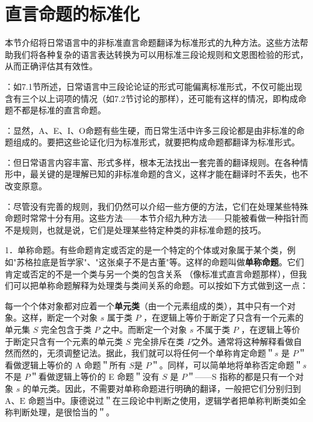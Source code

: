 \section{直言命题的标准化}

\begin{logicbox}[title=引言]
本节介绍将日常语言中的非标准直言命题翻译为标准形式的九种方法。这些方法帮助我们将各种复杂的语言表达转换为可以用标准三段论规则和文恩图检验的形式，从而正确评估其有效性。
\end{logicbox}

\begin{theorembox}[title=标准化的基本原则]
：如7.1节所述，日常语言中三段论论证的形式可能偏离标准形式，不仅可能出现含有三个以上词项的情况（如7.2节讨论的那样），还可能有这样的情况，即构成命题不都是标准的直言命题。

：显然，A、E、I、O命题有些生硬，而日常生活中许多三段论都是由非标准的命题组成的。要把这些论证化归为标准形式，就要把构成命题都翻译为标准形式。

：但日常语言内容丰富、形式多样，根本无法找出一套完善的翻译规则。在各种情形中，最关键的是理解已知的非标准命题的含义，这样才能在翻译时不丢失，也不改变原意。

：尽管没有完善的规则，我们仍然可以介绍一些方便的方法，它们在处理某些特殊命题时常常十分有用。这些方法——本节介绍九种方法——只能被看做一种指针而不是规则，也就是说，它们是处理某些特定种类的非标准命题的技巧。
\end{theorembox}

1．单称命题。有些命题肯定或否定的是一个特定的个体或对象属于某个类，例如"苏格拉底是哲学家"、"这张桌子不是古董"等。这样的命题叫做\textbf{单称命题}。它们肯定或否定的不是一个类与另一个类的包含关系 （像标准式直言命题那样），但我们可以把单称命题解释为处理类与类间关系的命题。可以按如下方式做到这一点：

每一个个体对象都对应着一个\textbf{单元类}（由一个元素组成的类），其中只有一个对象。这样，断定一个对象 $s$ 属于类 $P$ ，在逻辑上等价于断定了只含有一个元素的单元集 $S$ 完全包含于类 $P$ 之中。而断定一个对象 $s$ 不属于类 $P$ ，在逻辑上等价于断定只含有一个元素的单元类 $S$ 完全排斥在类 $P$之外。通常将这种解释看做自然而然的，无须调整记法。据此，我们就可以将任何一个单称肯定命题＂$s$ 是 $P$＂看做逻辑上等价的 A 命题＂所有 $S$是 $P$＂。同样，可以简单地将单称否定命题＂$s$ 不是 $P$＂看做逻辑上等价的 E 命题＂没有 $S$ 是 $P$＂——S 指称的都是只有一个对象 $s$ 的单元类。因此，不需要对单称命题进行明确的翻译，一般把它们分别归到 $\mathrm{A} 、 \mathrm{E}$ 命题当中。康德说过＂在三段论中判断之使用，逻辑学者把单称判断类如全称判断处理，是很恰当的＂\cite{kant1781}。

